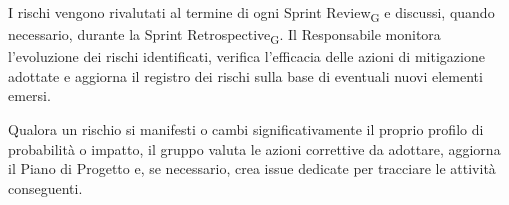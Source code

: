 I rischi vengono rivalutati al termine di ogni Sprint Review\textsubscript{G}
e discussi, quando necessario, durante la Sprint Retrospective\textsubscript{G}.
Il Responsabile monitora l'evoluzione dei rischi identificati, verifica
l'efficacia delle azioni di mitigazione adottate e aggiorna il registro dei
rischi sulla base di eventuali nuovi elementi emersi.

Qualora un rischio si manifesti o cambi significativamente il proprio profilo
di probabilità o impatto, il gruppo valuta le azioni correttive da adottare,
aggiorna il Piano di Progetto e, se necessario, crea issue dedicate per
tracciare le attività conseguenti.